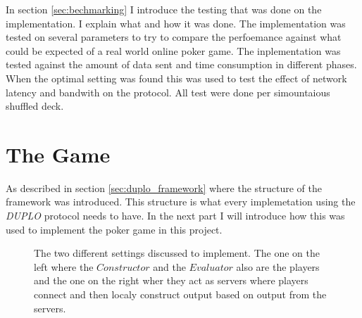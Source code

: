 \documentclass[twoside,11pt,openright]{report}
\newcommand{\DUPLO}{\textit{DUPLO} }
\begin{document}
In section \ref{sec:bechmarking} I introduce the testing that was done on the implementation. I explain what and how it was done. The implementation was tested on several parameters to try to compare the perfoemance against what could be expected of a real world online poker game. The inplementation was tested against the amount of data sent and time consumption in different phases. When the optimal setting was found this was used to test the effect of network latency and bandwith on the protocol. All test were done per simountaious shuffled deck.

\section{The Game}
\label{sec:poker_imp}
As described in section \ref{sec:duplo_framework} where the structure of the framework was introduced. This structure is what every implemetation using the \DUPLO protocol needs to have. In the next part I will introduce how this was used to implement the poker game in this project.

\bigskip

\begin{figure}
\centering

\caption{The two different settings discussed to implement. The one on the left where the $Constructor$ and the $Evaluator$ also are the players and the one on the right wher they act as servers where players connect and then localy construct output based on output from the servers.}
\label{fig:poker_setting}
\end{figure}
\end{document}
